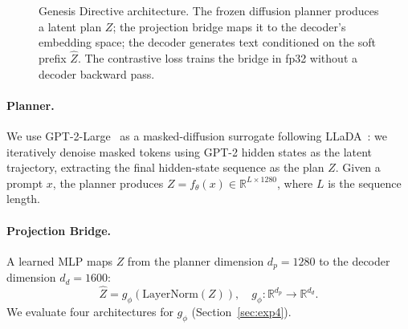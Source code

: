 \documentclass[11pt]{article}
\begin{document}
\begin{figure}[h]
  \centering
  \caption{Genesis Directive architecture. The frozen diffusion planner produces a
  latent plan $Z$; the projection bridge maps it to the decoder's embedding space;
  the decoder generates text conditioned on the soft prefix $\hat{Z}$.
  The contrastive loss trains the bridge in fp32 without a decoder backward pass.}
  \label{fig:architecture}
\end{figure}

\paragraph{Planner.}
We use GPT-2-Large~\citep{radford2019language} as a masked-diffusion surrogate
following LLaDA~\citep{nie2025llada}:
we iteratively denoise masked tokens using GPT-2 hidden states as the latent
trajectory, extracting the final hidden-state sequence as the plan $Z$.
Given a prompt $x$, the planner produces
$Z = f_\theta(x) \in \mathbb{R}^{L \times 1280}$, where $L$ is the sequence length.

\paragraph{Projection Bridge.}
A learned MLP maps $Z$ from the planner dimension $d_p = 1280$ to the decoder
dimension $d_d = 1600$:
\begin{equation}
  \hat{Z} = g_\phi\!\left(\mathrm{LayerNorm}(Z)\right), \quad
  g_\phi : \mathbb{R}^{d_p} \to \mathbb{R}^{d_d}.
  \label{eq:proj}
\end{equation}
We evaluate four architectures for $g_\phi$ (Section~\ref{sec:exp4}).
\end{document}
